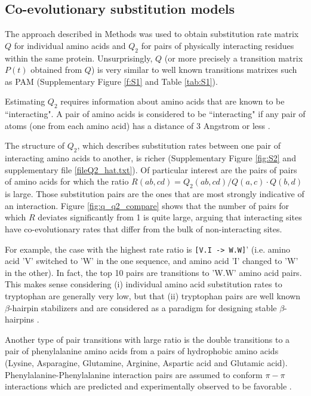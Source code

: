 \subsection{Co-evolutionary substitution models}

The approach described in Methods was used to obtain substitution rate matrix $Q$ for individual amino acids and $Q_2$ for pairs of physically interacting residues within the same protein. Unsurprisingly, $Q$ (or more precisely a transition matrix $P(t)$ obtained from $Q$) is very similar to well known transitions matrixes such as PAM \cite{} (Supplementary Figure \ref{f:S1} and Table \ref{tab:S1}).

Estimating $Q_2$ requires information about amino acids that are known to be “interacting". A pair of amino acids is considered to be “interacting" if any pair of atoms (one from each amino acid) has a distance of 3 Angstrom or less \cite{burger2010disentangling}. 

The structure of $Q_2$, which describes substitution rates between one pair of interacting amino acids to another, is richer (Supplementary Figure \ref{fig:S2} and supplementary file \ref{fileQ2_hat.txt}). Of particular interest are the pairs of pairs of amino acids for which the ratio $R(ab,cd) = Q_2 (ab, cd) / Q(a,c) \cdot Q(b,d)$ is large. Those substitution pairs are the ones that are most strongly indicative of an interaction. Figure \ref{fig:q_q2_compare} shows that the number of pairs for which $R$ deviates significantly from 1 is quite large, arguing that interacting sites have co-evolutionary rates that differ from the bulk of non-interacting sites.

For example, the case with the highest rate ratio is \texttt{[V.I -> W.W]}' (i.e. amino acid 'V' switched to 'W' in the one sequence, and amino acid 'I' changed to 'W' in the other). In fact, the top 10 pairs are transitions to 'W.W' amino acid pairs. This makes sense considering (i) individual amino acid substitution rates to tryptophan are generally very low, but that (ii) tryptophan pairs are well known $\beta$-hairpin stabilizers and are considered as a paradigm for designing stable $\beta$-hairpins \cite{santiveri2010tryptophan}.

Another type of pair transitions with large ratio is the double transitions to a pair of phenylalanine amino acids from a pairs of hydrophobic amino acids (Lysine, Asparagine, Glutamine, Arginine, Aspartic acid and Glutamic acid). Phenylalanine-Phenylalanine interaction pairs are assumed to conform $\pi-\pi$ interactions which are predicted and experimentally observed to be favorable \cite{hunter1991pi}.

